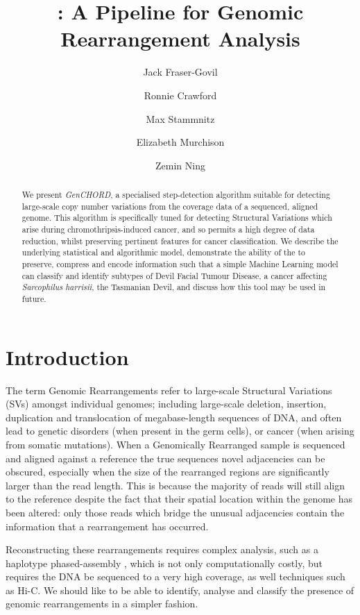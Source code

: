 \documentclass[fleqn,usenatbib]{acmart}
\title[GeneCHORD]{\codename{}: A Pipeline for Genomic Rearrangement Analysis}
\author{Jack Fraser-Govil}
\author{Ronnie Crawford}
\affiliation{
   \institution{Wellcome Sanger Institute}
   \city{Hinxton}
   \country{United Kingdom}
}
\author{Max Stammnitz}
\author{Elizabeth Murchison}
\affiliation{
   \institution{University of Cambridge}
   \city{Cambridge}
   \country{United Kingdom}
}
\author{Zemin Ning}
\affiliation{
   \institution{Wellcome Sanger Institute}
   \city{Hinxton}
   \country{United Kingdom}
   \postcode{CB10 1RQ}
}
\def\codename{\textit{GenCHORD}}
\begin{document}
	
	\begin{abstract}
		We present \codename{}, a specialised step-detection algorithm suitable for detecting large-scale copy number variations from the coverage data of a sequenced, aligned genome. This algorithm is specifically tuned for detecting Structural Variations which arise during chromothripsis-induced cancer, and so permits a high degree of data reduction, whilst preserving pertinent features for cancer classification. We describe the underlying statistical and algorithmic model, demonstrate the ability of the to preserve, compress and encode information such that a simple Machine Learning model can classify and identify subtypes of Devil Facial Tumour Disease, a cancer affecting \textit{Sarcophilus harrisii}, the Tasmanian Devil, and discuss how this tool may be used in future.   
	\end{abstract}
	\maketitle

	\newcommand\new[1]
	{
		{\color{red} #1}
	}

	\section{Introduction}
	
		{The term} Genomic Rearrangements refer to large-scale Structural Variations (SVs) amongst individual genomes; including large-scale deletion, insertion, duplication and translocation of megabase-length sequences of DNA,  and often lead to genetic disorders (when present in the germ cells), or cancer (when arising from somatic mutations). When a Genomically Rearranged sample is sequenced and aligned against a reference the true sequences novel adjacencies can be obscured, especially when the size of the rearranged regions are significantly larger than the read length. This is because the majority of  reads will still align to the reference despite the fact that their spatial location within the genome has been altered: only those reads which bridge the unusual adjacencies contain the information that a rearrangement has occurred.

		Reconstructing these rearrangements requires complex analysis, such as a haplotype phased-assembly , which is not only computationally costly, but requires the DNA be sequenced to a very high coverage, as well techniques such as Hi-C\cite{Ijaz2024}. We should like to be able to identify, analyse and classify the presence of genomic rearrangements in a simpler fashion.  
\end{document}
